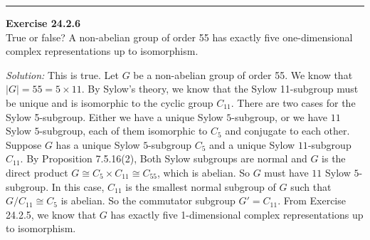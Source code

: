 \documentclass[a4paper, 12pt]{article}
\newenvironment{problem}[2][Exercise]
    { \begin{mdframed}[backgroundcolor=gray!20] \textbf{#1 #2} \\}
    {  \end{mdframed}}
\newenvironment{solution}
    {\textit{Solution:}}
    {}
\begin{document}
\noindent\rule{7in}{2.8pt}
\begin{problem}{24.2.6}
True or false? A non-abelian group of order 55 has exactly five one-dimensional complex representations up to isomorphism.
\end{problem}
\begin{solution}
This is true. Let \(G\) be a non-abelian group of order 55. We know that \(|G|=55=5\times 11\). By Sylow's theory, we know that the Sylow 11-subgroup must be unique and is isomorphic to the cyclic group \(C_{11}\). There are two cases for the Sylow 5-subgroup. Either we have 
a unique Sylow \(5\)-subgroup, or we have \(11\) Sylow \(5\)-subgroup, each of them isomorphic to \(C_5\) and conjugate to each other. Suppose \(G\) has a unique Sylow \(5\)-subgroup \(C_5\) and a unique Sylow \(11\)-subgroup \(C_{11}\). By Proposition 7.5.16(2), Both Sylow subgroups are normal and \(G\) is the 
direct product \(G\cong C_5\times C_{11}\cong C_{55}\), which is abelian. So \(G\) must have \(11\) Sylow \(5\)-subgroup. In this case, \(C_{11}\) is the smallest normal subgroup of \(G\) such that \(G/C_{11}\cong C_5\) is abelian. So the commutator subgroup \(G'=C_{11}\). From Exercise 24.2.5, we know that \(G\) has exactly five 1-dimensional complex representations 
up to isomorphism.
\end{solution}
\end{document}
